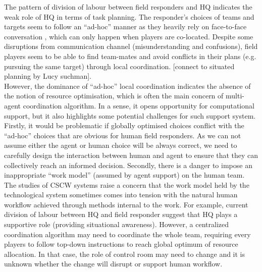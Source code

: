 The pattern of division of labour between field responders and HQ indicates the weak role of HQ in terms of task planning. The responder's choices of teams and targets seem to follow an ``ad-hoc'' manner as they heavily rely on face-to-face conversation , which can only happen when players are co-located. Despite some disruptions from communication channel (misunderstanding and confusions), field players seem to be able to find team-mates and avoid conflicts in their plans (e.g. pursuing the same target) through local coordination. [connect to situated planning by Lucy suchman]. \\

However, the dominance of ``ad-hoc'' local coordination indicates the absence of the notion of resource optimisation, which is often the main concern of multi-agent coordination algorithm. In a sense, it opens opportunity for computational support, but it also highlights some potential challenges for such support system. Firstly, it would be problematic if globally optimised choices conflict with the ``ad-hoc'' choices that are obvious for human field responders. As we can not assume either the agent or human choice will be always correct, we need to carefully design the interaction between human and agent to ensure that they can collectively reach an informed decision. Secondly, there is a danger to impose an inappropriate ``work model'' (assumed by agent support) on the human team. The studies of CSCW systems \cite{Bowers1994} raise a concern that the work model held by the technological system sometimes comes into tension with the natural human workflow achieved through methods internal to the work. For example, current division of labour between HQ and field responder suggest that HQ plays a supportive role (providing situational awareness). However, a centralized coordination algorithm may need to coordinate the whole team, requiring every players to follow top-down instructions to reach global optimum of resource allocation. In that case, the role of control room may need to change and it is unknown whether the change will disrupt or support human workflow.  \\

